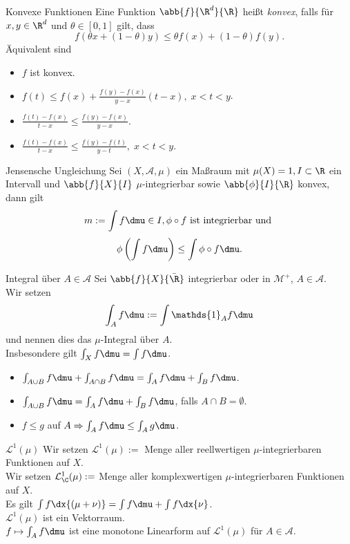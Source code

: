 \begin{karte}{Konvexe Funktionen}
	Eine Funktion \( \abb{f}{\R^d}{\R} \) heißt \textit{konvex}, 
	falls für \( x,y\in \R^d \) und \( \theta \in [0,1] \) gilt, dass 
	\[ f(\theta x + (1 - \theta)y) \leq \theta f(x) + (1 - \theta) f(y). \]
	Äquivalent sind 
	\begin{itemize}
		\item \(f\) ist konvex.
		\item \( f(t) \leq f(x) + \frac{f(y) - f(x)}{y - x} (t-x), \;x < t<y \).
		\item \( \frac{f(t) - f(x)}{t - x} \leq \frac{f(y) - f(x)}{y - x} \).
		\item \( \frac{f(t) - f(x)}{t - x} \leq \frac{f(y) - f(t)}{y - t}, \; x < t < y \).
	\end{itemize}
\end{karte}

\begin{karte}{Jensensche Ungleichung}
	Sei \( (X, \mathcal{A}, \mu) \) ein Maßraum mit 
	\( \mu(X) = 1, I \subset \R \) ein Intervall und 
	\( \abb{f}{X}{I} \) \(\mu\)-integrierbar sowie 
	\( \abb{\phi}{I}{\R} \) konvex, dann gilt 
	\[ m := \int f \dmu \in I, \phi \circ f \text{ ist integrierbar und } \]
	\[ \phi\left(\int f\dmu \right) \leq \int \phi \circ f \dmu. \]
\end{karte}

\begin{karte}{Integral über \(A \in \mathcal{A}\)}
	Sei \(\abb{f}{X}{\bar{\R}}\) integrierbar oder in \( \mathcal{M}^+ \), \(A \in \mathcal{A}\). \\
	Wir setzen 
	\[ \int_A f \dmu := \int \mathds{1}_A f \dmu \] 
	und nennen dies das \( \mu \)-Integral über \(A\).\\
	Insbesondere gilt \( \int_X f\dmu = \int f \dmu \).
	\begin{itemize}
		\item \( \int_{A\cup B} f\dmu + \int_{A\cap B} f\dmu = \int_A f \dmu + \int_B f \dmu \).
		\item \( \int_{A\cup B} f\dmu = \int_A f \dmu + \int_B f \dmu \), falls \(A \cap B = \emptyset\).
		\item \( f \leq g \) auf \(A \Rightarrow \int_A f \dmu \leq \int_A g \dmu\).
	\end{itemize}
\end{karte}

\begin{karte}{\(\mathcal{L}^1(\mu)\)}
	Wir setzen \( \mathcal{L}^1(\mu) := \) Menge aller reellwertigen \( \mu \)-integrierbaren Funktionen auf \(X\).\\
	Wir setzen \( \mathcal{L}^1_\C(\mu) := \) Menge aller komplexwertigen \( \mu \)-integrierbaren Funktionen auf \(X\).\\
	Es gilt \( \int f \dx{(\mu + \nu)} = \int f \dmu + \int f \dx{\nu} \).\\
	\( \mathcal{L}^1(\mu) \) ist ein Vektorraum.\\
	\(f \mapsto \int_A f \dmu\) ist eine monotone Linearform auf \( \mathcal{L}^1(\mu)  \) für \(A\in \mathcal{A}\).
\end{karte}

